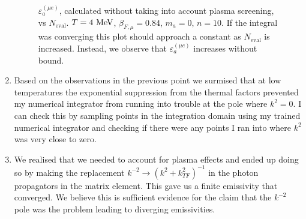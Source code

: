 \begin{enumerate}
\begin{figure}[htbp]
        \caption{$\varepsilon_a^{(\mu e)}$, calculated without taking into account plasma screening, vs $N_{\mathrm{eval}}$. $T = 4 ~\mathrm{MeV}$, $\beta_{F,\mu} = 0.84$, $m_a = 0$, $n = 10$. If the integral was converging this plot should approach a constant as $N_{\mathrm{eval}}$ is increased. Instead, we observe that $\varepsilon_a^{(\mu e)}$ increases without bound.}
        \label{fig:divergent-emissivity-vs-neval}
    \end{figure}
    \item Based on the observations in the previous point we surmised that at low temperatures the exponential suppression from the thermal factors prevented my numerical integrator from running into trouble at the pole where $k^2 = 0$. I can check this by sampling points in the integration domain using my trained numerical integrator and checking if there were any points I ran into where $k^2$ was very close to zero.
    \item We realised that we needed to account for plasma effects and ended up doing so by making the replacement  $k^{-2} \rightarrow (k^2 + k_{TF}^2)^{-1}$ in the photon propagators in the matrix element. This gave us a finite emissivity that converged. We believe this is sufficient evidence for the claim that the $k^{-2}$ pole was the problem leading to diverging emissivities.
\end{enumerate}